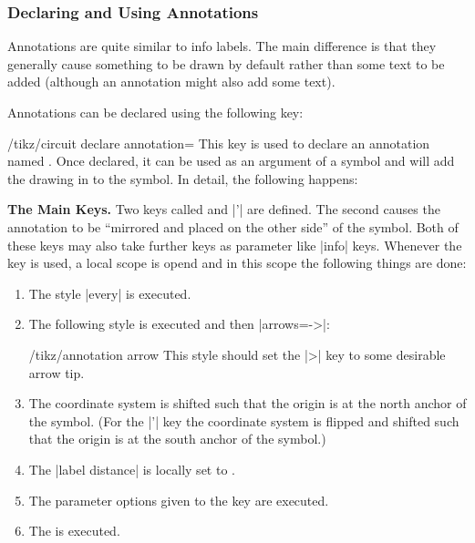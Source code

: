 \subsubsection{Declaring and Using Annotations}

Annotations are quite similar to info labels. The main difference is
that they generally cause something to be drawn by default rather than
some text to be added (although an annotation might also add some
text).

Annotations can be declared using the following key:

\begin{key}{/tikz/circuit declare annotation=}
  This key is used to declare an annotation named . Once
  declared, it can be used as an argument of a symbol and will add the
  drawing in  to the symbol. In detail, the following
  happens:

  \textbf{The Main Keys.}
  Two keys called  and |'| are
  defined. The second causes the annotation to be ``mirrored and
  placed on the other side'' of the symbol. Both of these keys may
  also take further keys as parameter like |info| keys.
  Whenever the  key is used, a local scope is opend and in
  this scope the following things are done:
  \begin{enumerate}
  \item The style |every|  is executed.
  \item The following style is executed and then |arrows=->|:
    \begin{stylekey}{/tikz/annotation arrow}
      This style should set the |>| key to some desirable arrow tip.
    \end{stylekey}
  \item The coordinate system is shifted such that the origin is at
    the north anchor of the symbol. (For the |'| key the
    coordinate system is flipped and shifted such that the origin is
    at the south anchor of the symbol.)
  \item The |label distance| is locally set to .
  \item The parameter options given to the  key are
    executed. 
  \item The  is executed.
  \end{enumerate}


\end{key}
